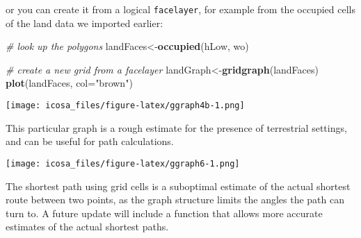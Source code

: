 \documentclass[]{article}
\newenvironment{Shaded}{\begin{snugshade}}{\end{snugshade}}
\newcommand{\KeywordTok}[1]{\textcolor[rgb]{0.13,0.29,0.53}{\textbf{#1}}}
\newcommand{\DataTypeTok}[1]{\textcolor[rgb]{0.13,0.29,0.53}{#1}}
\newcommand{\DecValTok}[1]{\textcolor[rgb]{0.00,0.00,0.81}{#1}}
\newcommand{\StringTok}[1]{\textcolor[rgb]{0.31,0.60,0.02}{#1}}
\newcommand{\CommentTok}[1]{\textcolor[rgb]{0.56,0.35,0.01}{\textit{#1}}}
\newcommand{\OperatorTok}[1]{\textcolor[rgb]{0.81,0.36,0.00}{\textbf{#1}}}
\newcommand{\NormalTok}[1]{#1}
\begin{document}
or you can create it from a logical \texttt{facelayer}, for example from
the occupied cells of the land data we imported earlier:

\begin{Shaded}
\begin{Highlighting}[]
\CommentTok{# look up the polygons}
\NormalTok{landFaces<-}\KeywordTok{occupied}\NormalTok{(hLow, wo)}

\CommentTok{# create a new grid from a facelayer}
\NormalTok{landGraph<-}\KeywordTok{gridgraph}\NormalTok{(landFaces)}
\KeywordTok{plot}\NormalTok{(landFaces, }\DataTypeTok{col=}\StringTok{"brown"}\NormalTok{)}
\end{Highlighting}
\end{Shaded}

\texttt{[image: icosa\_files/figure-latex/ggraph4b-1.png]}

This particular graph is a rough estimate for the presence of
terrestrial settings, and can be useful for path calculations.

\begin{Shaded}
\end{Shaded}

\texttt{[image: icosa\_files/figure-latex/ggraph6-1.png]}

The shortest path using grid cells is a suboptimal estimate of the
actual shortest route between two points, as the graph structure limits
the angles the path can turn to. A future update will include a function
that allows more accurate estimates of the actual shortest paths.
\end{document}
